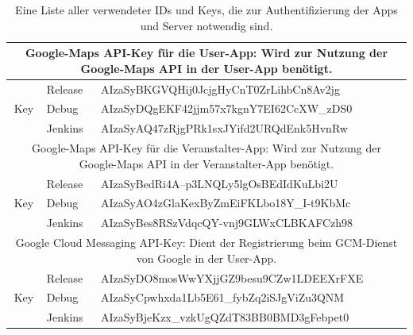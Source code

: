 \begin{table}[htb]
\begin{tabular}{|c|l|l|}
		\hline
		\hline
		\multicolumn{3}{|p{15cm}|}{
			Google-Maps API-Key für die User-App: Wird zur Nutzung der Google-Maps API in der User-App benötigt.
		} \\
		\hline
		\multirow{3}{3mm}{\begin{sideways}Key\end{sideways}} & Release & AIzaSyBKGVQHij0JcjgHyCnT0ZrLihbCn8Av2jg \\
		\cline{2-3}
		& Debug & AIzaSyDQgEKF42jjm57x7kgnY7EI62CcXW\_zDS0 \\
		\cline{2-3}
		& Jenkins & AIzaSyAQ47zRjgPRk1sxJYifd2URQdEnk5HvnRw \\
		\hline
		\hline
		\multicolumn{3}{|p{15cm}|}{
			Google-Maps API-Key für die Veranstalter-App: Wird zur Nutzung der Google-Maps API in der Veranstalter-App benötigt.
		} \\
		\hline
		\multirow{3}{3mm}{\begin{sideways}Key\end{sideways}} & Release & AIzaSyBedRi4A--p3LNQLy5lgOsBEdIdKuLbi2U \\
		\cline{2-3}
		& Debug & AIzaSyAO4zGlaKexByZmEiFKLbo18Y\_I-t9KbMc \\
		\cline{2-3}
		& Jenkins & AIzaSyBes8RSzVdqcQY-vnj9GLWxCLBKAFCzh98 \\
		\hline
		\hline
		\multicolumn{3}{|p{15cm}|}{
			Google Cloud Messaging API-Key: Dient der Registrierung beim GCM-Dienst von Google in der User-App.
		} \\
		\hline
		\multirow{3}{3mm}{\begin{sideways}Key\end{sideways}} & Release & AIzaSyDO8mosWwYXjjGZ9besu9CZw1LDEEXrFXE \\
		\cline{2-3}
		& Debug & AIzaSyCpwhxda1Lb5E61\_fybZq2iSJgViZu3QNM \\
		\cline{2-3}
		& Jenkins & AIzaSyBjeKzx\_vzkUgQZdT83BB0BMD3gFebpet0 \\
		\hline
	\end{tabular}
	\caption{Eine Liste aller verwendeter IDs und Keys, die zur Authentifizierung der Apps und Server notwendig sind.}
	\label{tab:keys}
\end{table}
